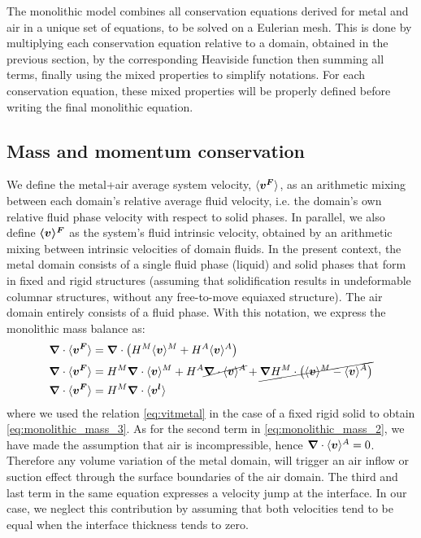  
The monolithic model combines all conservation equations derived for metal and air in a unique set of equations, to be solved on a Eulerian mesh.
This is done by multiplying each conservation equation relative to a domain, obtained in the previous section, by the corresponding Heaviside
function then summing all terms, finally using the mixed properties to simplify notations.
For each conservation equation, these mixed properties will be properly defined before writing the final monolithic equation.

\subsection{Mass and momentum conservation}
We define the metal+air average system velocity, $\langle \boldsymbol{v^F} \rangle$, as an arithmetic mixing between each domain's relative average fluid velocity,
i.e. the domain's own relative fluid phase velocity with respect to solid phases. In parallel, we also define $\boldsymbol{\langle v \rangle^F}$ as the system's 
fluid intrinsic velocity, obtained by an arithmetic mixing between intrinsic velocities of domain fluids. 
In the present context, the metal domain consists of a single fluid phase (liquid) and solid phases that form in fixed and rigid structures 
(assuming that solidification results in undeformable columnar structures, without any free-to-move equiaxed structure).
The air domain entirely consists of a fluid phase.
With this notation, we express the monolithic mass balance as:
\begin{align}
\label{eq:monolithic_mass_1}
& \boldsymbol{\nabla} \cdot \langle \boldsymbol{v^F} \rangle = \boldsymbol{\nabla} \cdot \left( H^M \langle \boldsymbol{v} \rangle^M + H^A \langle \boldsymbol{v} \rangle^A \right) \\
\label{eq:monolithic_mass_2}
& \boldsymbol{\nabla} \cdot \langle \boldsymbol{v^F} \rangle = H^M \boldsymbol{\nabla} \cdot \langle \boldsymbol{v} \rangle^M + H^A \cancel{\boldsymbol{\nabla} \cdot \langle \boldsymbol{v} \rangle^A} + \cancel{\boldsymbol{\nabla} H^M \cdot \left( \langle \boldsymbol{v} \rangle^M - \langle \boldsymbol{v} \rangle^A \right)}\\
\label{eq:monolithic_mass_3}
& \boldsymbol{\nabla} \cdot \langle \boldsymbol{v^F} \rangle = H^M \boldsymbol{\nabla} \cdot \langle \boldsymbol{v^l} \rangle
\end{align}
where we used the relation \cref{eq:vitmetal} in the case of a fixed rigid solid to obtain \cref{eq:monolithic_mass_3}.
As for the second term in \cref{eq:monolithic_mass_2}, we have made the assumption that air is incompressible, hence $\boldsymbol{\nabla} \cdot \langle \boldsymbol{v} \rangle^A= 0$. 
Therefore any volume variation of the metal domain, will trigger an air inflow or suction effect through the surface boundaries of
the air domain. The third and last term in the same equation 
expresses a velocity jump at the interface. 
In our case, we neglect this contribution by assuming that both velocities tend to be equal
when the interface thickness tends to zero. 

